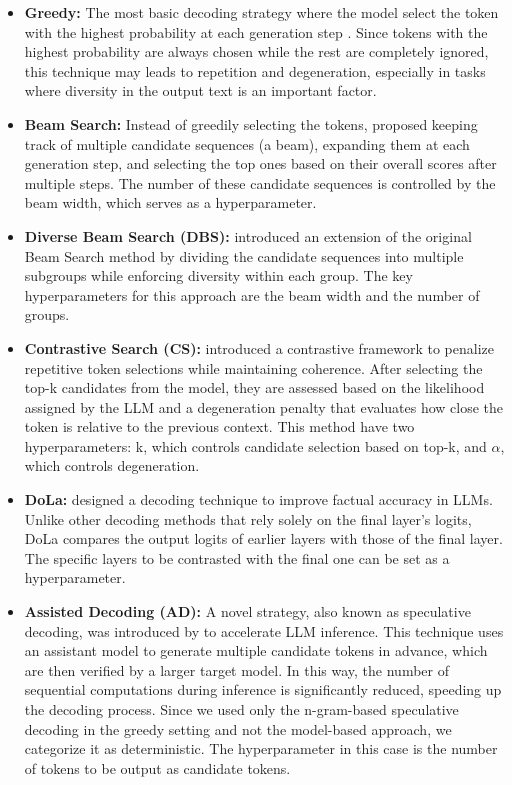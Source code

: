 \begin{itemize}\itemsep0em 
    \item \textbf{Greedy:} The most basic decoding strategy where the model select the token with the highest probability at each generation step \cite{two,consistency}. Since tokens with the highest probability are always chosen while the rest are completely ignored, this technique may leads to repetition and degeneration, especially in tasks where diversity in the output text is an important factor.
    
    \item \textbf{Beam Search:} Instead of greedily selecting the tokens, \cite{beam} proposed keeping track of multiple candidate sequences (a beam), expanding them at each generation step, and selecting the top ones based on their overall scores after multiple steps. The number of these candidate sequences is controlled by the beam width, which serves as a hyperparameter.
    
    \item \textbf{Diverse Beam Search (DBS):} \cite{dbs} introduced an extension of the original Beam Search method by dividing the candidate sequences into multiple subgroups while enforcing diversity within each group. The key hyperparameters for this approach are the beam width and the number of groups.
    \item \textbf{Contrastive Search (CS):} \cite{six} introduced a contrastive framework to penalize repetitive token selections while maintaining coherence. After selecting the top-k candidates from the model, they are assessed based on the likelihood assigned by the LLM and a degeneration penalty that evaluates how close the token is relative to the previous context. This method have two hyperparameters: k, which controls candidate selection based on top-k, and \( \alpha\), which controls degeneration.
    \item \textbf{DoLa:} \cite{seven} designed a decoding technique to improve factual accuracy in LLMs. Unlike other decoding methods that rely solely on the final layer’s logits, DoLa compares the output logits of earlier layers with those of the final layer. The specific layers to be contrasted with the final one can be set as a hyperparameter.
    \item \textbf{Assisted Decoding (AD):} A novel strategy, also known as speculative decoding, was introduced by \cite{speculative} to accelerate LLM inference. This technique uses an assistant model to generate multiple candidate tokens in advance, which are then verified by a larger target model. In this way, the number of sequential computations during inference is significantly reduced, speeding up the decoding process. Since we used only the n-gram-based speculative decoding in the greedy setting and not the model-based approach, we categorize it as deterministic. The hyperparameter in this case is the number of tokens to be output as candidate tokens.
\end{itemize}

